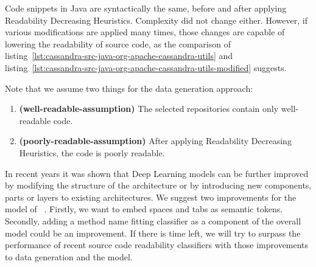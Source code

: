 \documentclass[%
class=scrreprt,
chapterprefix=false,%
open=right,%
twoside=false,%
paper=a4,%
logofile={Logo\_zentral\_farbig\_EN.png},%
thesistype=master,%
UKenglish,%
]{se2thesis}
\begin{document}
	Code snippets in Java are syntactically the same, before and after applying Readability Decreasing Heuristics. Complexity did not change either. However, if various modifications are applied many times, those changes are capable of lowering the readability of source code, as the comparison of listing~\ref{lst:cassandra-src-java-org-apache-cassandra-utils} and listing~\ref{lst:cassandra-src-java-org-apache-cassandra-utils-modified} suggests.
	
	Note that we assume two things for the data generation approach:
	\begin{enumerate}[label={Assumption \arabic*},ref={\arabic*},leftmargin=*]
		\item \label{well-readable-assumption} \textbf{(well-readable-assumption)} The selected repositories contain only well-readable code.
		\item \label{poorly-readable-assumption} \textbf{(poorly-readable-assumption)} After applying Readability Decreasing Heuristics, the code is poorly readable.
	\end{enumerate}
	
	\label{model-modifications}
	In recent years it was shown that Deep Learning models can be further improved by modifying the structure of the architecture or by introducing new components, parts or layers to existing architectures. 
	We suggest two improvements for the model of \citeauthor{mi2022towards}~\cite{mi2022towards}. Firstly, we want to embed spaces and tabs as semantic tokens. Secondly, adding a method name fitting classifier as a component of the overall model could be an improvement.
	\label{suggestions}If there is time left, we will try to surpass the performance of recent source code readability classifiers with those improvements to data generation and the model.
	
	
\end{document}
